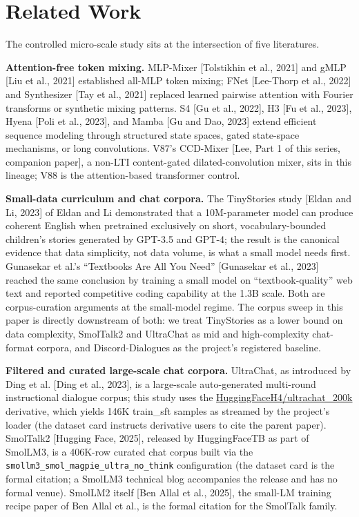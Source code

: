 \documentclass[11pt]{article}
\begin{document}
\section{Related Work}

The controlled micro-scale study sits at the intersection of five literatures.

\textbf{Attention-free token mixing.} MLP-Mixer [Tolstikhin et al., 2021] and gMLP [Liu et al., 2021] established all-MLP token mixing; FNet [Lee-Thorp et al., 2022] and Synthesizer [Tay et al., 2021] replaced learned pairwise attention with Fourier transforms or synthetic mixing patterns. S4 [Gu et al., 2022], H3 [Fu et al., 2023], Hyena [Poli et al., 2023], and Mamba [Gu and Dao, 2023] extend efficient sequence modeling through structured state spaces, gated state-space mechanisms, or long convolutions. V87's CCD-Mixer [Lee, Part 1 of this series, companion paper], a non-LTI content-gated dilated-convolution mixer, sits in this lineage; V88 is the attention-based transformer control.

\textbf{Small-data curriculum and chat corpora.} The TinyStories study [Eldan and Li, 2023] of Eldan and Li demonstrated that a 10M-parameter model can produce coherent English when pretrained exclusively on short, vocabulary-bounded children's stories generated by GPT-3.5 and GPT-4; the result is the canonical evidence that data simplicity, not data volume, is what a small model needs first. Gunasekar et al.'s ``Textbooks Are All You Need'' [Gunasekar et al., 2023] reached the same conclusion by training a small model on ``textbook-quality'' web text and reported competitive coding capability at the 1.3B scale. Both are corpus-curation arguments at the small-model regime. The corpus sweep in this paper is directly downstream of both: we treat TinyStories as a lower bound on data complexity, SmolTalk2 and UltraChat as mid and high-complexity chat-format corpora, and Discord-Dialogues as the project's registered baseline.

\textbf{Filtered and curated large-scale chat corpora.} UltraChat, as introduced by Ding et al. [Ding et al., 2023], is a large-scale auto-generated multi-round instructional dialogue corpus; this study uses the \href{https://huggingface.co/datasets/HuggingFaceH4/ultrachat_200k}{HuggingFaceH4/ultrachat\_200k} derivative, which yields 146K train\_sft samples as streamed by the project's loader (the dataset card instructs derivative users to cite the parent paper). SmolTalk2 [Hugging Face, 2025], released by HuggingFaceTB as part of SmolLM3, is a 406K-row curated chat corpus built via the \texttt{smollm3\_smol\_magpie\_ultra\_no\_think} configuration (the dataset card is the formal citation; a SmolLM3 technical blog accompanies the release and has no formal venue). SmolLM2 itself [Ben Allal et al., 2025], the small-LM training recipe paper of Ben Allal et al., is the formal citation for the SmolTalk family.
\end{document}
